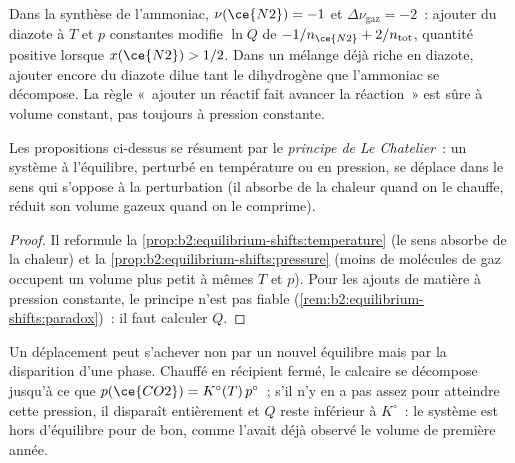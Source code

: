\begin{remark}\label{rem:b2:equilibrium-shifts:paradox}
Dans la synthèse de l'ammoniac, $\nu(\ce{N2}) = -1$ et $\Delta\nu_{\text{gaz}} = -2$~:
ajouter du diazote à $T$ et $p$ constantes modifie $\ln Q$ de $-1/n_{\ce{N2}} +
2/n_{\text{tot}}$, quantité positive lorsque $x(\ce{N2}) > 1/2$. Dans un mélange
déjà riche en diazote, ajouter encore du diazote dilue tant le dihydrogène
que l'ammoniac se décompose. La règle «~ajouter un réactif fait avancer la réaction~» est sûre
à volume constant, pas toujours à pression constante.
\end{remark}

\begin{proposition}\label{prop:b2:equilibrium-shifts:le-chatelier}
Les propositions ci-dessus se résument par le \emph{principe de Le
Chatelier}~: un système à l'équilibre,
perturbé en température ou en pression, se déplace dans le sens qui s'oppose à
la perturbation (il absorbe de la chaleur quand on le chauffe, réduit son volume gazeux quand on le
comprime).
\end{proposition}

\begin{proof}
Il reformule la \cref{prop:b2:equilibrium-shifts:temperature} (le sens
 absorbe de la chaleur) et la \cref{prop:b2:equilibrium-shifts:pressure} (moins de
molécules de gaz occupent un volume plus petit à mêmes $T$ et $p$). Pour les ajouts de
matière à pression constante, le principe n'est pas fiable
(\cref{rem:b2:equilibrium-shifts:paradox})~: il faut calculer $Q$.
\end{proof}

\begin{remark}\label{rem:b2:equilibrium-shifts:rupture}
Un déplacement peut s'achever non par un nouvel équilibre mais par la disparition d'une phase.
Chauffé en récipient fermé, le calcaire se décompose jusqu'à ce que $p(\ce{CO2}) =
K^\circ(T)\,p^\circ$~; s'il n'y en a pas assez pour atteindre cette pression, il
disparaît entièrement et $Q$ reste inférieur à $K^\circ$~: le système est hors
d'équilibre pour de bon, comme l'avait déjà observé le volume de première année.
\end{remark}

